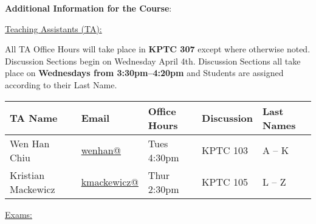 \noindent \textbf {\Large \sc Additional Information for the Course}:

\vspace{1cm}

\noindent \underline{Teaching Assistants (TA):}

\noindent All TA Office Hours will take place in \textbf{KPTC 307} except where otherwise noted. Discussion Sections begin on Wednesday April 4th. Discussion Sections all take place on \textbf{Wednesdays from 3:30pm--4:20pm} and Students are assigned according to their Last Name.

\vspace{1cm}

\begin{tabular}{l l | l | l l }

TA Name & Email & Office Hours & Discussion & Last Names \\ \hline

Wen Han Chiu & \href{mailto:wenhan@uchicago.edu}{wenhan@} & Tues 4:30pm & KPTC 103 & A -- K \\


Kristian Mackewicz & \href{mailto:kmackewicz@uchicago.edu}{kmackewicz@} & Thur 2:30pm & KPTC 105 & L -- Z  \\


\end{tabular}

\vspace{1cm}

\noindent \underline{Exams:}
  
